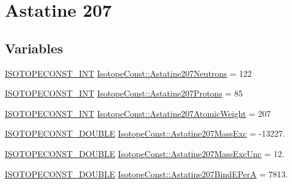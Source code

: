 \hypertarget{group___isotope_const-_astatine-_at207}{}\section{Astatine 207}
\label{group___isotope_const-_astatine-_at207}
\subsection*{Variables}
\begin{DoxyCompactItemize}
\item 
\mbox{\hyperlink{group___isotope_const-_macros_ga5f18360b3e99483a35c32d789e62621c}{I\+S\+O\+T\+O\+P\+E\+C\+O\+N\+S\+T\+\_\+\+I\+NT}} \mbox{\hyperlink{group___isotope_const-_astatine-_at207_ga2da58ea1ac2d108d9b0c643c560f7069}{Isotope\+Const\+::\+Astatine207\+Neutrons}} = 122
\item 
\mbox{\hyperlink{group___isotope_const-_macros_ga5f18360b3e99483a35c32d789e62621c}{I\+S\+O\+T\+O\+P\+E\+C\+O\+N\+S\+T\+\_\+\+I\+NT}} \mbox{\hyperlink{group___isotope_const-_astatine-_at207_ga91d602ffcc0a9a44091b1cd50e0a00e5}{Isotope\+Const\+::\+Astatine207\+Protons}} = 85
\item 
\mbox{\hyperlink{group___isotope_const-_macros_ga5f18360b3e99483a35c32d789e62621c}{I\+S\+O\+T\+O\+P\+E\+C\+O\+N\+S\+T\+\_\+\+I\+NT}} \mbox{\hyperlink{group___isotope_const-_astatine-_at207_ga5655f884dee8f51a3c004c4508deec56}{Isotope\+Const\+::\+Astatine207\+Atomic\+Weight}} = 207
\item 
\mbox{\hyperlink{group___isotope_const-_macros_ga8f45a7272ce02c0b4c65c44636ed719a}{I\+S\+O\+T\+O\+P\+E\+C\+O\+N\+S\+T\+\_\+\+D\+O\+U\+B\+LE}} \mbox{\hyperlink{group___isotope_const-_astatine-_at207_gaaad7fc1f30070ec9756a8bc156edf818}{Isotope\+Const\+::\+Astatine207\+Mass\+Exc}} = -\/13227.
\item 
\mbox{\hyperlink{group___isotope_const-_macros_ga8f45a7272ce02c0b4c65c44636ed719a}{I\+S\+O\+T\+O\+P\+E\+C\+O\+N\+S\+T\+\_\+\+D\+O\+U\+B\+LE}} \mbox{\hyperlink{group___isotope_const-_astatine-_at207_ga01c4abb96b9c1ae15447992e5ff4001f}{Isotope\+Const\+::\+Astatine207\+Mass\+Exc\+Unc}} = 12.
\item 
\mbox{\hyperlink{group___isotope_const-_macros_ga8f45a7272ce02c0b4c65c44636ed719a}{I\+S\+O\+T\+O\+P\+E\+C\+O\+N\+S\+T\+\_\+\+D\+O\+U\+B\+LE}} \mbox{\hyperlink{group___isotope_const-_astatine-_at207_ga02dc2696b281df6c567f3ac0ed13c8d5}{Isotope\+Const\+::\+Astatine207\+Bind\+E\+PerA}} = 7813.
\item 

\end{DoxyCompactItemize}
